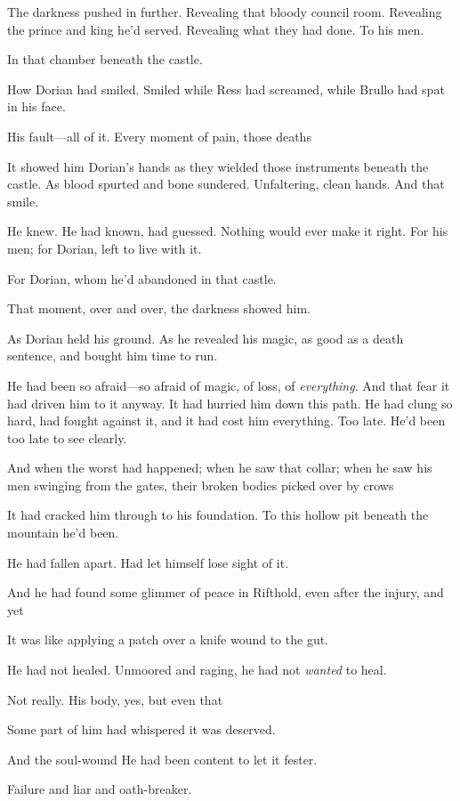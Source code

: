 The darkness pushed in further. Revealing that bloody council room. Revealing the prince and king he'd served. Revealing what they had done. To his men.

In that chamber beneath the castle.

How Dorian had smiled. Smiled while Ress had screamed, while Brullo had spat in his face.

His fault---all of it. Every moment of pain, those deaths 

It showed him Dorian's hands as they wielded those instruments beneath the castle. As blood spurted and bone sundered. Unfaltering, clean hands. And that smile.

He knew. He had known, had guessed. Nothing would ever make it right. For his men; for Dorian, left to live with it.

For Dorian, whom he'd abandoned in that castle.

That moment, over and over, the darkness showed him.

As Dorian held his ground. As he revealed his magic, as good as a death sentence, and bought him time to run.

He had been so afraid---so afraid of magic, of loss, of
\emph{everything}. And that fear  it had driven him to it anyway. It had hurried him down this path. He had clung so hard, had fought against it, and it had cost him everything. Too late. He'd been too late to see clearly.

And when the worst had happened; when he saw that collar; when he saw his men swinging from the gates, their broken bodies picked over by crows 

It had cracked him through to his foundation. To this hollow pit beneath the mountain he'd been.

He had fallen apart. Had let himself lose sight of it.

And he had found some glimmer of peace in Rifthold, even after the injury, and yet 

It was like applying a patch over a knife wound to the gut.

He had not healed. Unmoored and raging, he had not \emph{wanted} to heal.

Not really. His body, yes, but even that 

Some part of him had whispered it was deserved.

And the soul-wound  He had been content to let it fester.

Failure and liar and oath-breaker.

